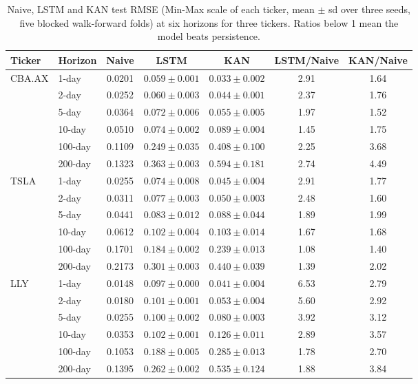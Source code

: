 \begin{table}[!ht]
\centering
\scriptsize
\setlength{\tabcolsep}{4pt}
\begin{tabular}{|l|l|c|c|c|c|c|}
\hline
\textbf{Ticker} & \textbf{Horizon} & \textbf{Naive} & \textbf{LSTM} & \textbf{KAN} & \textbf{LSTM/Naive} & \textbf{KAN/Naive} \\
\hline
  \multirow{6}{*}{CBA.AX} & 1-day & 0.0201 & $0.059 \pm 0.001$ & $0.033 \pm 0.002$ & 2.91 & 1.64 \\
   & 2-day & 0.0252 & $0.060 \pm 0.003$ & $0.044 \pm 0.001$ & 2.37 & 1.76 \\
   & 5-day & 0.0364 & $0.072 \pm 0.006$ & $0.055 \pm 0.005$ & 1.97 & 1.52 \\
   & 10-day & 0.0510 & $0.074 \pm 0.002$ & $0.089 \pm 0.004$ & 1.45 & 1.75 \\
   & 100-day & 0.1109 & $0.249 \pm 0.035$ & $0.408 \pm 0.100$ & 2.25 & 3.68 \\
   & 200-day & 0.1323 & $0.363 \pm 0.003$ & $0.594 \pm 0.181$ & 2.74 & 4.49 \\
\hline
  \multirow{6}{*}{TSLA} & 1-day & 0.0255 & $0.074 \pm 0.008$ & $0.045 \pm 0.004$ & 2.91 & 1.77 \\
   & 2-day & 0.0311 & $0.077 \pm 0.003$ & $0.050 \pm 0.003$ & 2.48 & 1.60 \\
   & 5-day & 0.0441 & $0.083 \pm 0.012$ & $0.088 \pm 0.044$ & 1.89 & 1.99 \\
   & 10-day & 0.0612 & $0.102 \pm 0.004$ & $0.103 \pm 0.014$ & 1.67 & 1.68 \\
   & 100-day & 0.1701 & $0.184 \pm 0.002$ & $0.239 \pm 0.013$ & 1.08 & 1.40 \\
   & 200-day & 0.2173 & $0.301 \pm 0.003$ & $0.440 \pm 0.039$ & 1.39 & 2.02 \\
\hline
  \multirow{6}{*}{LLY} & 1-day & 0.0148 & $0.097 \pm 0.000$ & $0.041 \pm 0.004$ & 6.53 & 2.79 \\
   & 2-day & 0.0180 & $0.101 \pm 0.001$ & $0.053 \pm 0.004$ & 5.60 & 2.92 \\
   & 5-day & 0.0255 & $0.100 \pm 0.002$ & $0.080 \pm 0.003$ & 3.92 & 3.12 \\
   & 10-day & 0.0353 & $0.102 \pm 0.001$ & $0.126 \pm 0.011$ & 2.89 & 3.57 \\
   & 100-day & 0.1053 & $0.188 \pm 0.005$ & $0.285 \pm 0.013$ & 1.78 & 2.70 \\
   & 200-day & 0.1395 & $0.262 \pm 0.002$ & $0.535 \pm 0.124$ & 1.88 & 3.84 \\
\hline
\end{tabular}
\caption{Naive, LSTM and KAN test RMSE (Min-Max scale of each ticker, mean $\pm$ sd over three seeds, five blocked walk-forward folds) at six horizons for three tickers. Ratios below 1 mean the model beats persistence.}
\label{table_multi_ticker}
\end{table}
